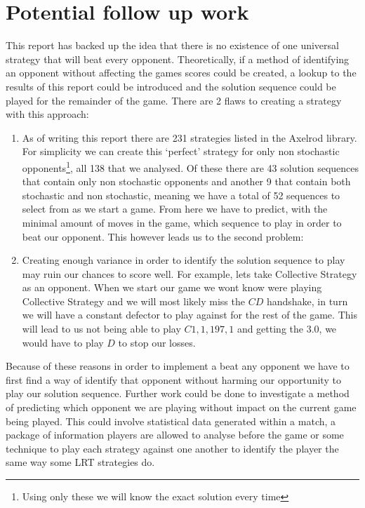 \section{Potential follow up work}\label{sec:follow_up}
This report has backed up the idea that there is no existence of one universal strategy that will beat every opponent.
Theoretically, if a method of identifying an opponent without affecting the games scores could be created, a lookup to the results of this report could be introduced and the solution sequence could be played for the remainder of the game.
There are 2 flaws to creating a strategy with this approach:
\begin{enumerate}
    \item {As of writing this report there are 231 strategies listed in the Axelrod library.
    For simplicity we can create this `perfect' strategy for only non stochastic opponents\footnote{Using only these we will know the exact solution every time}, all 138 that we analysed.
    Of these there are 43 solution sequences that contain only non stochastic opponents and another 9 that contain both stochastic and non stochastic, meaning we have a total of 52 sequences to select from as we start a game.
    From here we have to predict, with the minimal amount of moves in the game, which sequence to play in order to beat our opponent.
    This however leads us to the second problem:}

    \item {Creating enough variance in order to identify the solution sequence to play may  ruin our chances to score well.
    For example, lets take Collective Strategy as an opponent.
    When we start our game we wont know were playing Collective Strategy and we will most likely miss the $CD$ handshake, in turn we will have a constant defector to play against for the rest of the game.
    This will lead to us not being able to play $C1,1,197,1$ and getting the $3.0$, we would have to play $D$ to stop our losses.}
\end{enumerate}

Because of these reasons in order to implement a beat any opponent we have to first find a way of identify that opponent without harming our opportunity to play our solution sequence. 
Further work could be done to investigate a method of predicting which opponent we are playing without impact on the current game being played.
This could involve statistical data generated within a match, a package of information players are allowed to analyse before the game or some technique to play each strategy against one another to identify the player the same way some LRT strategies do.

